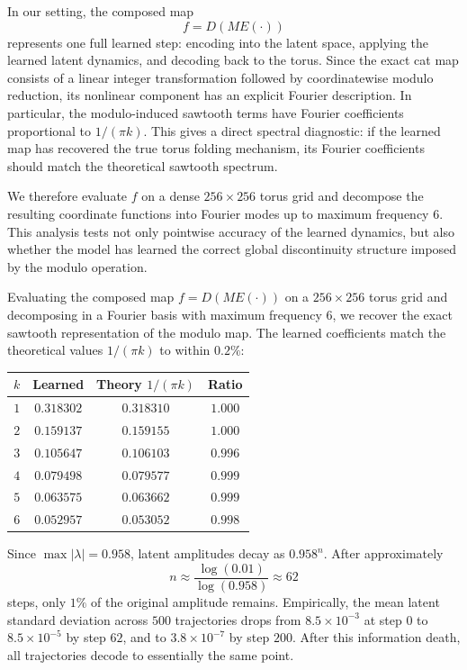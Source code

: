 \documentclass{article}
\begin{document}
In our setting, the composed map
$$
f = D(ME(\cdot))
$$
represents one full learned step: encoding into the latent space, applying the learned latent dynamics, and decoding back to the torus. Since the exact cat map consists of a linear integer transformation followed by coordinatewise modulo reduction, its nonlinear component has an explicit Fourier description. In particular, the modulo-induced sawtooth terms have Fourier coefficients proportional to $1/(\pi k)$. This gives a direct spectral diagnostic: if the learned map has recovered the true torus folding mechanism, its Fourier coefficients should match the theoretical sawtooth spectrum.

We therefore evaluate $f$ on a dense $256\times256$ torus grid and decompose the resulting coordinate functions into Fourier modes up to maximum frequency $6$. This analysis tests not only pointwise accuracy of the learned dynamics, but also whether the model has learned the correct global discontinuity structure imposed by the modulo operation.


Evaluating the composed map $f = D(ME(\cdot))$ on a $256\times256$ torus grid and decomposing in a Fourier basis with maximum frequency $6$, we recover the exact sawtooth representation of the modulo map. The learned coefficients match the theoretical values $1/(\pi k)$ to within $0.2\%$:

\begin{table}[!ht]
\centering
\begin{tabular}{cccc}
\toprule
$k$ & Learned & Theory $1/(\pi k)$ & Ratio \\
\midrule
$1$ & $0.318302$ & $0.318310$ & $1.000$ \\
$2$ & $0.159137$ & $0.159155$ & $1.000$ \\
$3$ & $0.105647$ & $0.106103$ & $0.996$ \\
$4$ & $0.079498$ & $0.079577$ & $0.999$ \\
$5$ & $0.063575$ & $0.063662$ & $0.999$ \\
$6$ & $0.052957$ & $0.053052$ & $0.998$ \\
\bottomrule
\end{tabular}
\end{table}



Since $\max|\lambda|=0.958$, latent amplitudes decay as $0.958^n$. After approximately
$$
n \approx \frac{\log(0.01)}{\log(0.958)} \approx 62
$$
steps, only $1\%$ of the original amplitude remains. Empirically, the mean latent standard deviation across $500$ trajectories drops from $8.5\times10^{-3}$ at step $0$ to $8.5\times10^{-5}$ by step $62$, and to $3.8\times10^{-7}$ by step $200$. After this information death, all trajectories decode to essentially the same point.
\end{document}
